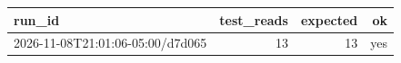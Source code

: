 \begin{tabular}{lrrr}
\toprule
run\_id & test\_reads & expected & ok \\
\midrule
2026-11-08T21:01:06-05:00/d7d065 & 13 & 13 & yes \\
\bottomrule
\end{tabular}
